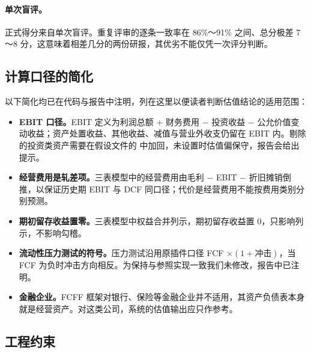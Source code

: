 \paragraph{单次盲评。}正式得分来自单次盲评。重复评审的逐条一致率在 86\%～91\% 之间、总分极差 7～8 分，这意味着相差几分的两份研报，其优劣不能仅凭一次评分判断。

\subsection{计算口径的简化}

以下简化均已在代码与报告中注明，列在这里以便读者判断估值结论的适用范围：

\begin{itemize}
  \item \textbf{EBIT 口径。}EBIT 定义为利润总额 + 财务费用 − 投资收益 − 公允价值变动收益；资产处置收益、其他收益、减值与营业外收支仍留在 EBIT 内。剔除的投资类资产需要在假设文件的  中加回，未设置时估值偏保守，报告会给出提示。
  \item \textbf{经营费用是轧差项。}三表模型中的经营费用由毛利 − EBIT − 折旧摊销倒推，以保证历史期 EBIT 与 DCF 同口径；代价是经营费用不能按费用类别分别预测。
  \item \textbf{期初留存收益置零。}三表模型中权益合并列示，期初留存收益置 0，只影响列示，不影响勾稽。
  \item \textbf{流动性压力测试的符号。}压力测试沿用原插件口径 FCF $\times(1+\text{冲击})$，当 FCF 为负时冲击方向相反。为保持与参照实现一致我们未修改，报告中已注明。
  \item \textbf{金融企业。}FCFF 框架对银行、保险等金融企业并不适用，其资产负债表本身就是经营资产。对这类公司，系统的估值输出应只作参考。
\end{itemize}

\subsection{工程约束}


